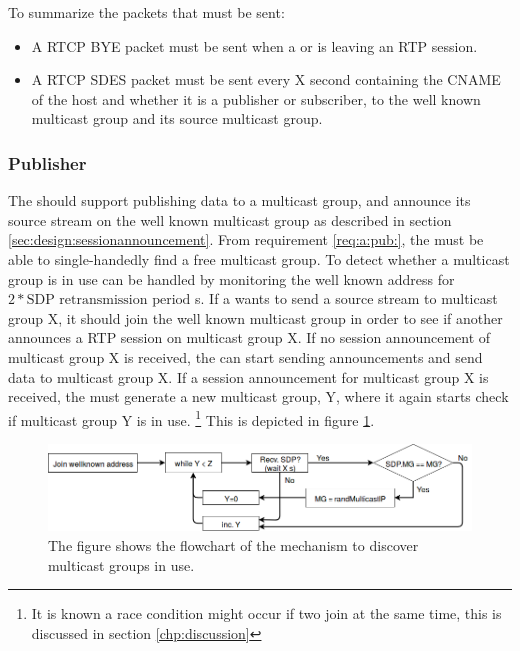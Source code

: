 To summarize the packets that must be sent:
\begin{itemize}
	\item A RTCP BYE packet must be sent when a \sub{} or \pub{} is leaving an RTP session.
	\item A RTCP SDES packet must be sent every X second containing the CNAME of the host and whether it is a publisher or subscriber, to the well known multicast group and its source multicast group.
\end{itemize}


\subsubsection{Publisher} \label{sec:design:publisher}
The \pub{} should support publishing data to a multicast group, and announce its source stream on the well known multicast group as described in section \ref{sec:design:sessionannouncement}.
From requirement \ref{req:a:pub:}, the \pub{} must be able to single-handedly find a free multicast group. To detect whether a multicast group is in use can be handled by monitoring the well known address for $2*\text{SDP retransmission period}$ s. If a  wants to send a source stream to multicast group X, it should join the well known multicast group in order to see if another  announces a RTP session on multicast group X. If no session announcement of multicast group X is received, the  can start sending announcements and send data to multicast group X. If a session announcement for multicast group X is received, the  must generate a new multicast group, Y, where it again starts check if multicast group Y is in use. \footnote{It is known a race condition might occur if two \pubs{} join at the same time, this is discussed in section \ref{chp:discussion}} This is depicted in figure \ref{fig:design:pubsub:inuse}.

\begin{figure}[H]
	\centering
	\includegraphics[width=\textwidth]{figures/flowchart-publisher-mg}
	\caption{The figure shows the flowchart of the mechanism to discover multicast groups in use.} \label{fig:design:pubsub:inuse}
\end{figure}

